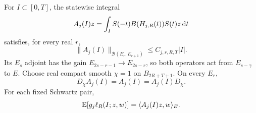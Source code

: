 \begin{lemma}\label{L:driver-gain-localization}
  For $I \subset [0,T]$, the statewise integral
  \begin{equation}\label{E:driver-coefficient-operator}
    A_j(I)z=\int_I S(-t)B(H_{j,R}(t))S(t)z\,\mathrm{d} t
  \end{equation}
  satisfies, for every real $r$,
  \begin{equation}\label{E:driver-gain-one}
    \|A_j(I)\|_{\mathcal{B}(E_r,E_{r+1})}
    \le C_{j,r,R,T}|I|.
  \end{equation}
  Its $E_s$ adjoint has the gain $E_{2s-r-1} \to E_{2s-r}$, so both operators
  act from $E_{s-\gamma}$ to $E$. Choose real compact smooth $\chi = 1$ on
  $B_{2R+T+1}$. On every $E_r$,
  \begin{equation}\label{E:driver-actual-localization}
    D_\chi A_j(I)=A_j(I)=A_j(I)D_\chi.
  \end{equation}
  For each fixed Schwartz pair,
  \begin{equation}\label{E:driver-covariance-row}
    \mathbb{E}[g_j\ell_R(I;z,w)]=\langle A_j(I)z,w\rangle_E.
  \end{equation}
\end{lemma}

